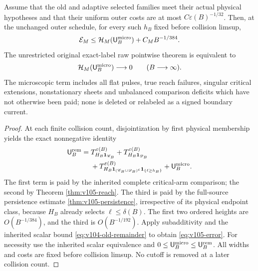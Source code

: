 \begin{theorem}
\label{thm:v105-original}
Assume that the old and adaptive selected families meet their
actual physical hypotheses and that their uniform outer costs
are at most $C\varepsilon(B)^{-1/32}$. Then, at the unchanged
outer schedule, for every such $h_B$ fixed before collision limsup,
\begin{equation}\label{eq:v105-error}
\mathcal E_M\le
 \mathcal H_M(\mathsf U_B^{\rm micro})+C_MB^{-1/384}.
\end{equation}
The unrestricted original exact-label raw pointwise theorem is
equivalent to
\[
\mathcal H_M(\mathsf U_B^{\rm micro})\longrightarrow0
\qquad (B\longrightarrow\infty).
\]
The microscopic term includes all flat pulses, true reach failures,
singular critical extensions, nonstationary sheets and unbalanced
comparison deficits which have not otherwise been paid; none
is deleted or relabeled as a signed boundary current.
\end{theorem}
\begin{proof}
At each finite collision count, disjointization by first physical
membership yields the exact nonnegative identity
\begin{align*}
\mathsf U_B^{\rm rem}
={}&T_{H_B\mathbf1_{\mathscr C_B}}^{\varepsilon(B)}
  +T_{H_B\mathbf1_{\mathscr D_B}}^{\varepsilon(B)}\\
&+T_{H_B\mathbf1_{(\mathscr C_B\cup\mathscr D_B)^c}
          \mathbf1_{\{\ell\ge h_B\}}}^{\varepsilon(B)}
  +\mathsf U_B^{\rm micro}.
\end{align*}
The first term is paid by the inherited complete critical-arm
comparison; the second by Theorem \ref{thm:v105-reach}.
The third is paid by the full-source persistence estimate
\ref{thm:v105-persistence}, irrespective of its physical endpoint
class, because $H_B$ already selects $\ell\le\delta(B)$.
The first two ordered heights are $O(B^{-1/384})$, and the
third is $O(B^{-1/192})$. Apply subadditivity and the inherited
scalar bound \eqref{eq:v104-old-remainder} to obtain
\eqref{eq:v105-error}. For necessity use the inherited scalar
equivalence and $0\le\mathsf U_B^{\rm micro}\le
\mathsf U_B^{\rm rem}$. All widths and costs are fixed before
collision limsup. No cutoff is removed at a later collision count.
\end{proof}

